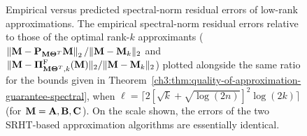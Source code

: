 \begin{figure}
 \centering
 \caption[Empirical versus predicted spectral-norm residual errors of low-rank approximations]{%
 {\sc Empirical versus predicted spectral-norm residual errors of low-rank approximations.} The empirical spectral-norm residual errors relative to those of the optimal rank-$k$ approximants 
 ($\left\|\mathbf{M} - \mathbf{P}_{\mathbf{M}\mathbf{\Theta}^T} \mathbf{M}\right\|_2/\|\mathbf{M} - \mathbf{M}_k\|_2$ and 
 $\|\mathbf{M} - \boldsymbol{\Pi}_{\mathbf{M}\mathbf{\Theta}^T,k}^{\mathrm{F}}(\mathbf{M})\|_2/\|\mathbf{M} - \mathbf{M}_k\|_2$) plotted alongside the same ratio for the bounds given in 
 Theorem~\ref{ch3:thm:quality-of-approximation-guarantee-spectral}, when $\ell = \lceil 2[\sqrt{k} + \sqrt{\log(2n)}]^2 \log(2k) \rceil$ 
 (for $\mathbf{M} = \mathbf{A}, \mathbf{B}, \mathbf{C}$). On the scale shown, the errors of the two SRHT-based approximation algorithms are essentially identical.}
 \label{ch3:fig:predictedspecerrvsactual}
\end{figure}

